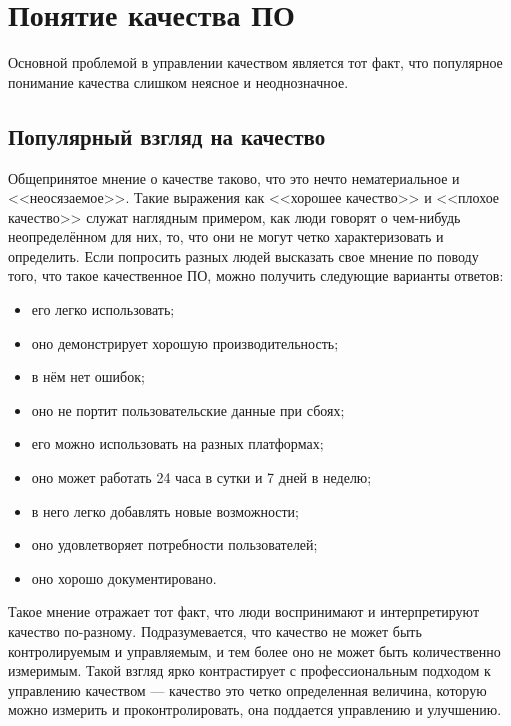 \documentclass{../../text-style}
\begin{document}
\maketitle
\thispagestyle{empty}


\section{Понятие качества ПО}

Основной проблемой в управлении качеством является тот факт, что популярное понимание качества слишком неясное и неоднозначное. 

\subsection{Популярный взгляд на качество}

Общепринятое мнение о качестве таково, что это нечто нематериальное и <<неосязаемое>>. Такие выражения как <<хорошее качество>> и <<плохое качество>> служат наглядным примером, как люди говорят о чем-нибудь неопределённом для них, то, что они не могут четко характеризовать и определить. Если попросить разных людей высказать свое мнение по поводу того, что такое качественное ПО, можно получить следующие варианты ответов:

\begin{itemize}
    \item его легко использовать;
    \item оно демонстрирует хорошую производительность;
    \item в нём нет ошибок;
    \item оно не портит пользовательские данные при сбоях;
    \item его можно использовать на разных платформах;
    \item оно может работать 24 часа в сутки и 7 дней в неделю;
    \item в него легко добавлять новые возможности;
    \item оно удовлетворяет потребности пользователей;
    \item оно хорошо документировано.
\end{itemize}

Такое мнение отражает тот факт, что люди воспринимают и интерпретируют качество по-разному. Подразумевается, что качество не может быть контролируемым и управляемым, и тем более оно не может быть количественно измеримым. Такой взгляд ярко контрастирует с профессиональным подходом к управлению качеством --- качество это четко определенная величина, которую можно измерить и проконтролировать, она поддается управлению и улучшению.
\end{document}
